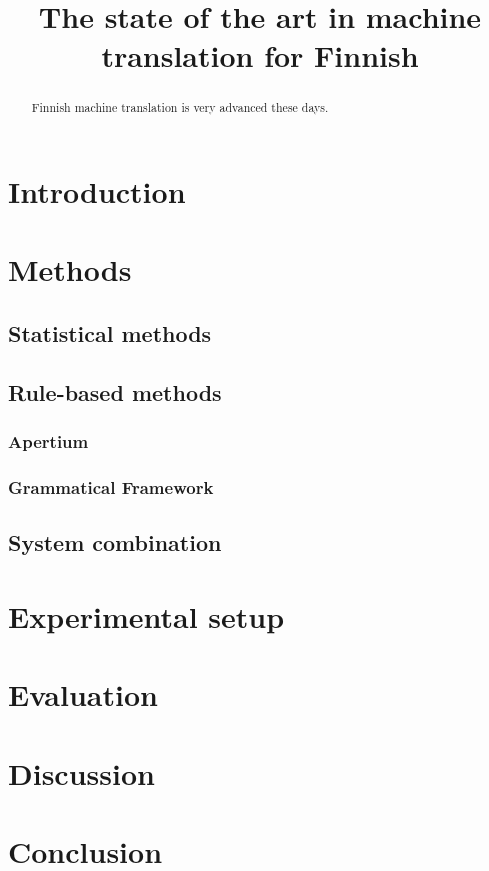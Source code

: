 \documentclass[b5paper]{article}
\title{The state of the art in machine translation for Finnish}
\author{Tommi A. Pirinen \and Francis M. Tyers \and }
\begin{document}
\maketitle

\begin{abstract}
Finnish machine translation is very advanced these days.
\end{abstract}

\section{Introduction}
\label{sec:introduction}





\section{Methods}
\label{sec:methods}

\subsection{Statistical methods}

\subsection{Rule-based methods}

\subsubsection{Apertium}

\subsubsection{Grammatical Framework}

\subsection{System combination}


\section{Experimental setup}
\label{sec:experimental-setup}

\section{Evaluation}
\label{sec:evaluation}

\section{Discussion}
\label{sec:discussion}

\section{Conclusion}
\label{sec:conclusion}
\end{document}
